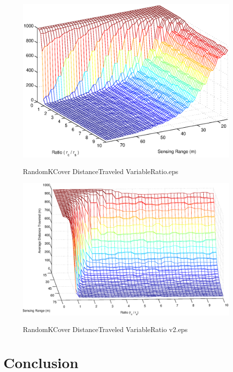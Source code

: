 \documentclass[10pt, conference, compsocconf, twocolumn]{IEEEtran}
\begin{document}
\begin{figure}
  \includegraphics[width=3.2 in]{RandomKCover_DistanceTraveled_VariableRatio.eps}\\
  \caption{RandomKCover DistanceTraveled VariableRatio.eps}\label{RandomKCover_DistanceTraveled_VariableRatio.eps}
\end{figure}


\begin{figure}
  \includegraphics[width=3.2 in]{RandomKCover_DistanceTraveled_VariableRatio_v2.eps}\\
  \caption{RandomKCover DistanceTraveled VariableRatio v2.eps}\label{RandomKCover_DistanceTraveled_VariableRatio.eps}
\end{figure}





\section{Conclusion} \label{sec:conclusion}




\end{document}
